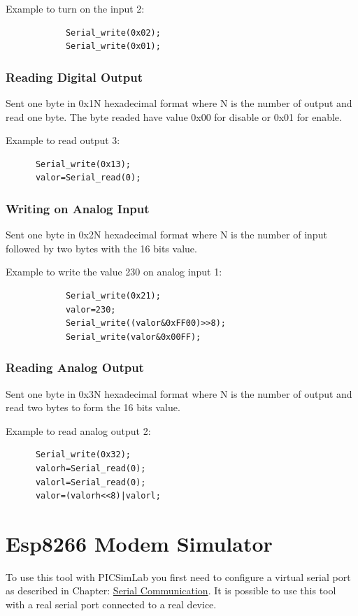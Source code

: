 Example to turn on the input 2:
\begin{verbatim}
            Serial_write(0x02);
            Serial_write(0x01);
\end{verbatim}


\subsubsection{Reading Digital Output}
Sent one byte in 0x1N hexadecimal format where N  is the number of output and read one byte. The byte readed have value 0x00 for disable or 0x01 for enable. 

Example to read output 3:
\begin{verbatim}
      Serial_write(0x13);
      valor=Serial_read(0);
\end{verbatim}


\subsubsection{Writing on Analog Input} 
Sent one byte in 0x2N hexadecimal format where N  is the number of input followed by two bytes with the 16 bits value.

Example to write the value 230 on analog input 1:
\begin{verbatim}
            Serial_write(0x21);
            valor=230;
            Serial_write((valor&0xFF00)>>8);
            Serial_write(valor&0x00FF);
\end{verbatim}

\subsubsection{Reading Analog Output}
Sent one byte in 0x3N hexadecimal format where N  is the number of output and read two bytes to form the 16 bits value.

Example to read analog output 2:
\begin{verbatim}
      Serial_write(0x32);
      valorh=Serial_read(0);
      valorl=Serial_read(0);
      valor=(valorh<<8)|valorl;
\end{verbatim}



\section{Esp8266 Modem Simulator} \hypertarget{def:espmsim}{}

To use this tool with PICSimLab you first need to configure a virtual serial port as described in Chapter: \hyperlink{def:seriali}{Serial Communication}.
It is possible to use this tool with a real serial port connected to a real device. 

